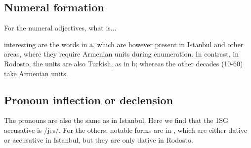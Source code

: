 \subsection{Numeral formation}

For the numeral adjectives, what is... 

\begin{adjarianpage}\label{page:260}\end{adjarianpage}%

interesting are the words in a, which are however present in Istanbul and other areas, where they require Armenian units during enumeration. In contrast, in Rodosto, the units are also Turkish, as in b; whereas the other decades (10-60) take Armenian units. 


\begin{table}[H]
	\centering 
	\caption{Borrowed numerals in the Rodosto dialect}
	\label{tab:Rodosto:morpho:noun:numeral}
\end{table}

\subsection{Pronoun inflection or declension}
The pronouns are also the same as in Istanbul. Here we find that the 1SG accusative is /jes/. For the others, notable forms are in , which are either dative or accusative in Istanbul, but they are only dative in Rodosto. 


